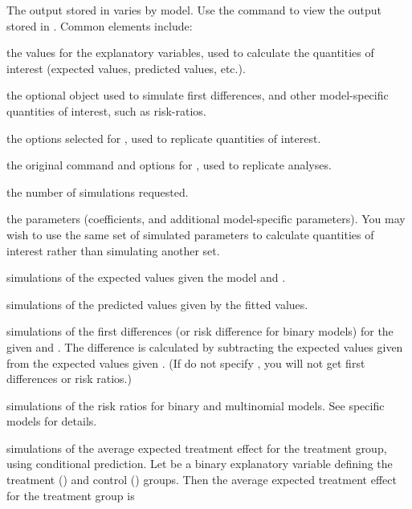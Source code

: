 \begin{Value}
The output stored in  varies by model.  Use the
 command to view the output stored in .
Common elements include: 
\begin{ldescription}
\item[\code{x}] the  values for the explanatory variables,
used to calculate the quantities of interest (expected values,
predicted values, etc.). 
\item[\code{x1}] the optional  object used to simulate
first differences, and other model-specific quantities of
interest, such as risk-ratios.
\item[\code{call}] the options selected for , used to
replicate quantities of interest. 
\item[\code{zelig.call}] the original command and options for
, used to replicate analyses. 
\item[\code{num}] the number of simulations requested. 
\item[\code{par}] the parameters (coefficients, and additional
model-specific parameters).  You may wish to use the same set of
simulated parameters to calculate quantities of interest rather
than simulating another set.
\item[\code{qi\$ev}] simulations of the expected values given the
model and . 
\item[\code{qi\$pr}] simulations of the predicted values given by the
fitted values. 
\item[\code{qi\$fd}] simulations of the first differences (or risk
difference for binary models) for the given  and .
The difference is calculated by subtracting the expected values
given  from the expected values given .  (If do not
specify , you will not get first differences or risk
ratios.) 
\item[\code{qi\$rr}] simulations of the risk ratios for binary and
multinomial models.  See specific models for details.
\item[\code{qi\$ate.ev}] simulations of the average expected
treatment effect for the treatment group, using conditional
prediction. Let  be a binary explanatory variable defining
the treatment () and control () groups.  Then the
average expected treatment effect for the treatment group is

\end{ldescription}
\end{Value}
